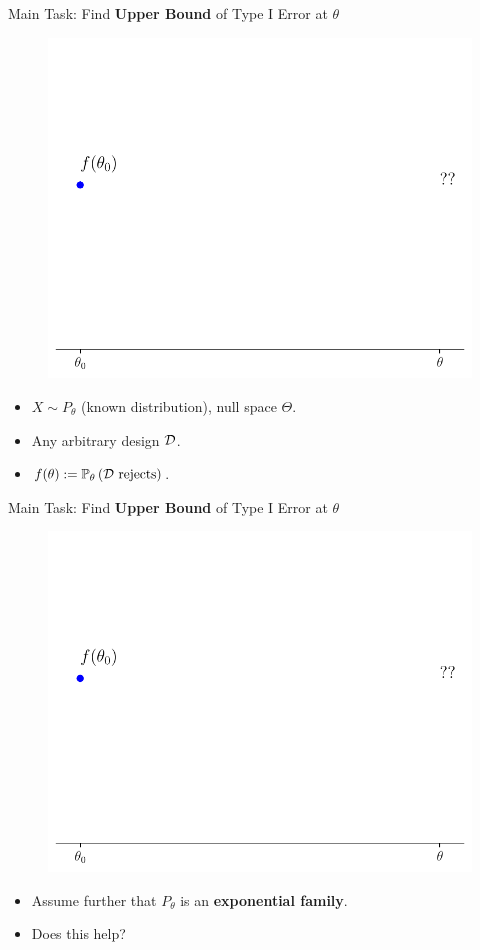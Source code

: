 \begin{frame}{Main Task: Find \textbf{Upper Bound} of Type I Error at $\theta$}
\begin{figure}
    \centering
    \includegraphics[width=0.75\linewidth]{figs/cse_problem.pdf}
\end{figure}
\begin{itemize}
    \item $X \sim P_\theta$ (known distribution), null space $\Theta$.
    \item Any arbitrary design $\mathcal{D}$.
    \item $f(\theta) := \mathbb{P}_\theta\left( \mathcal{D} \text{ rejects} \right)$.
\end{itemize} 
\end{frame}

\begin{frame}{Main Task: Find \textbf{Upper Bound} of Type I Error at $\theta$}
\begin{figure}
    \centering
    \includegraphics[width=0.75\linewidth]{figs/cse_problem.pdf}
\end{figure}
\begin{itemize}
    \item Assume further that $P_\theta$ is an \textbf{exponential family}.
    \item Does this help?
\end{itemize}
\end{frame}

